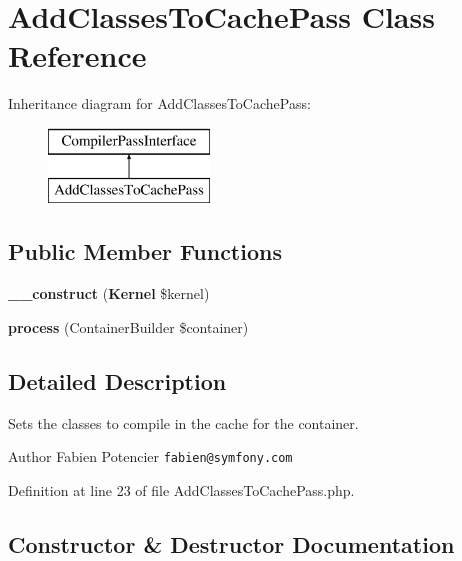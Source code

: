 \section{Add\+Classes\+To\+Cache\+Pass Class Reference}
\label{class_symfony_1_1_component_1_1_http_kernel_1_1_dependency_injection_1_1_add_classes_to_cache_pass}
Inheritance diagram for Add\+Classes\+To\+Cache\+Pass\+:\begin{figure}[H]
\begin{center}
\leavevmode
\includegraphics[height=2.000000cm]{class_symfony_1_1_component_1_1_http_kernel_1_1_dependency_injection_1_1_add_classes_to_cache_pass}
\end{center}
\end{figure}
\subsection*{Public Member Functions}
\begin{DoxyCompactItemize}
\item 
{\bf \+\_\+\+\_\+construct} ({\bf Kernel} \$kernel)
\item 
{\bf process} (Container\+Builder \$container)
\end{DoxyCompactItemize}


\subsection{Detailed Description}
Sets the classes to compile in the cache for the container.

\begin{DoxyAuthor}{Author}
Fabien Potencier {\tt fabien@symfony.\+com} 
\end{DoxyAuthor}


Definition at line 23 of file Add\+Classes\+To\+Cache\+Pass.\+php.



\subsection{Constructor \& Destructor Documentation}
